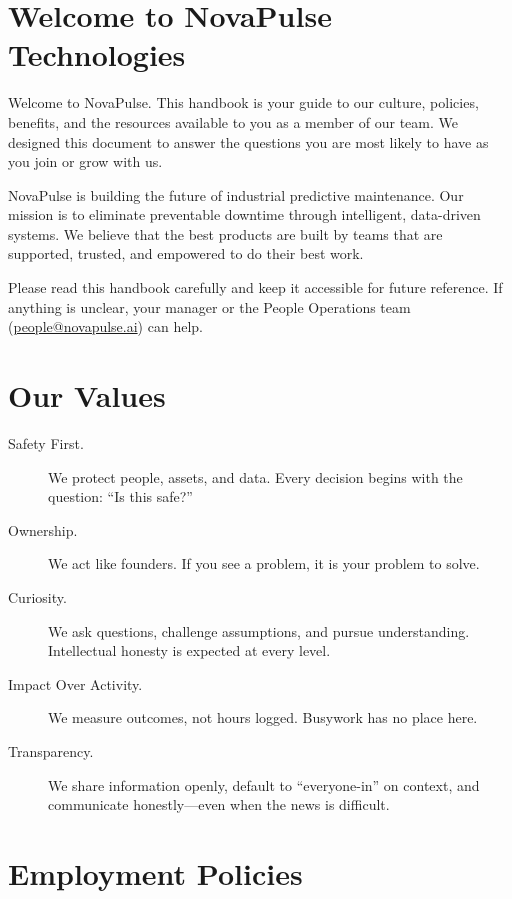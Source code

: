 \documentclass[
    language=english,
    doctype=employee-handbook,
    institution=none,
]{../../omnilatex}
\begin{document}
\maketitle

\section*{Welcome to NovaPulse Technologies}

Welcome to NovaPulse. This handbook is your guide to our culture, policies,
benefits, and the resources available to you as a member of our team. We
designed this document to answer the questions you are most likely to have as
you join or grow with us.

NovaPulse is building the future of industrial predictive maintenance. Our
mission is to eliminate preventable downtime through intelligent,
data-driven systems. We believe that the best products are built by teams
that are supported, trusted, and empowered to do their best work.

Please read this handbook carefully and keep it accessible for future reference.
If anything is unclear, your manager or the People Operations team
(\href{mailto:people@novapulse.ai}{people@novapulse.ai}) can help.

\section{Our Values}

\begin{description}
    \item[Safety First.] We protect people, assets, and data. Every decision
        begins with the question: ``Is this safe?''
    \item[Ownership.] We act like founders. If you see a problem, it is your
        problem to solve.
    \item[Curiosity.] We ask questions, challenge assumptions, and pursue
        understanding. Intellectual honesty is expected at every level.
    \item[Impact Over Activity.] We measure outcomes, not hours logged.
        Busywork has no place here.
    \item[Transparency.] We share information openly, default to
        ``everyone-in'' on context, and communicate honestly---even when the
        news is difficult.
\end{description}

\section{Employment Policies}
\end{document}
